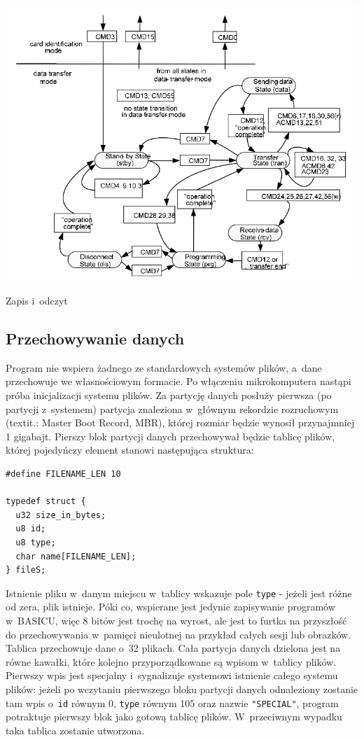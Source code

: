 \documentclass[shortabstract]{iithesis}
\begin{document}
\begingroup
\centering
\includegraphics[width=\textwidth]{sd-transfer.png}
\captionsetup{type=figure}
\caption{Zapis i~odczyt}
\endgroup

\subsection{Przechowywanie danych}
Program nie wspiera żadnego ze standardowych systemów plików, a~dane przechowuje we własnościowym formacie. Po włączeniu mikrokomputera nastąpi próba inicjalizacji systemu plików. Za partycję danych posłuży pierwsza (po partycji z~systemem) partycja znaleziona w~głównym rekordzie rozruchowym (textit{.: Master Boot Record, MBR}), której rozmiar będzie wynosił przynajmniej 1 gigabajt. Pierszy blok partycji danych przechowywał będzie tablicę plików, której pojedyńczy element stanowi następująca struktura:
\begin{verbatim}
#define FILENAME_LEN 10

typedef struct {
  u32 size_in_bytes;
  u8 id;
  u8 type;
  char name[FILENAME_LEN];
} fileS;
\end{verbatim}

Istnienie pliku w~danym miejscu w~tablicy wskazuje pole \texttt{type} - jeżeli jest różne od zera, plik istnieje. Póki co, wspierane jest jedynie zapisywanie programów w~BASICU, więc 8 bitów jest trochę na wyrost, ale jest to furtka na przyszłość do przechowywania w~pamięci nieulotnej na przykład całych sesji lub obrazków. Tablica przechowuje dane o~32 plikach. Cała partycja danych dzielona jest na równe kawałki, które kolejno przyporządkowane są wpisom w~tablicy plików. Pierwszy wpis jest specjalny i~sygnalizuje systemowi istnienie całego systemu plików: jeżeli po wczytaniu pierwszego bloku partycji danych odnaleziony zostanie tam wpis o~\texttt{id} równym 0, \texttt{type} równym 105 oraz nazwie \texttt{"SPECIAL"}, program potraktuje pierwszy blok jako gotową tablicę plików. W~przeciwnym wypadku taka tablica zostanie utworzona.
\end{document}
